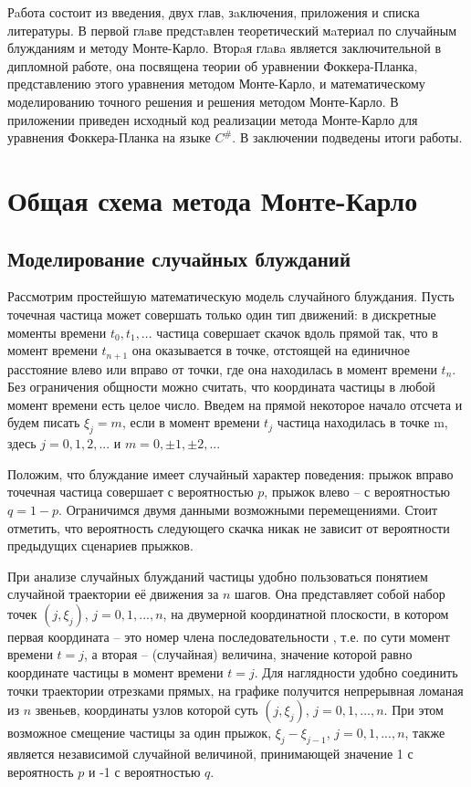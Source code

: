 \documentclass[a4paper]{report}
\begin{document}
Рaбота состоит из введения, двух глав, зaключения, приложения и списка литературы. В первой глaве предстaвлен теоретический мaтериал по случайным блужданиям и методу Монте-Карло. Вторaя глaвa является заключительной в дипломной работе, она посвящена теории об уравнении Фоккера-Планка, представлению этого уравнения методом Монте-Карло, и математическому моделированию точного решения и решения методом Монте-Карло. В приложении приведен исходный код реализации метода Монте-Карло для уравнения Фоккера-Планка на языке $C^\#$. В заключении подведены итоги работы.


\chapter{Общая схема метода Монте-Карло}



\section{Моделирование случайных блужданий}

Рассмотрим простейшую математическую модель случайного блуждания. Пусть точечная частица может совершать только один тип движений: в дискретные моменты времени $t_{0},t_{1},...$ частица совершает скачок вдоль прямой так, что в момент времени $t_{n+1}$ она оказывается в точке, отстоящей на единичное расстояние влево или вправо от точки, где она находилась в момент времени $t_{n}$. Без ограничения общности можно считать, что координата частицы в любой момент времени есть целое число. Введем на прямой некоторое начало отсчета и будем писать $\xi_{j}=m$, если в момент времени $t_{j}$ частица находилась в точке m, здесь $j=0,1,2,...$ и $m=0,\pm1,\pm2,...$

Положим, что блуждание имеет случайный характер поведения: прыжок вправо точечная частица совершает с вероятностью $p$,  прыжок влево -- с вероятностью~$q=1-p$. Ограничимся двумя данными возможными перемещениями. Стоит отметить, что вероятность следующего скачка никак не зависит от вероятности предыдущих сценариев прыжков.

При анализе случайных блужданий частицы удобно пользоваться понятием случайной траектории её движения за $n$ шагов. Она представляет собой набор точек $(j,\xi_{j})$, $j=0,1,...,n$, на двумерной координатной плоскости, в котором первая координата -- это номер члена последовательности , т.е. по сути момент времени $t=j$, а вторая -- (случайная) величина, значение которой равно координате частицы в момент времени $t=j$. Для наглядности удобно соединить точки траектории отрезками прямых, на графике получится непрерывная ломаная из $n$ звеньев, координаты узлов которой суть $(j,\xi_{j})$, $j=0,1,...,n$. При этом возможное смещение частицы за один прыжок, $\xi_{j}-\xi_{j-1}$, $j=0,1,...,n$, также является независимой случайной величиной, принимающей значение 1 с вероятность $p$ и -1 с вероятностью $q$.
\end{document}

